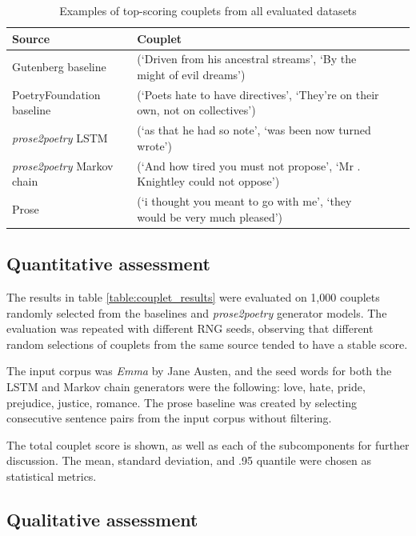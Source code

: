 \documentclass[11pt,a4paper]{article}
\begin{document}
\begin{table}[ht]
\begin{tabular*}{\textwidth}{ll cc}
	\hline\hline
	Source & Couplet \\ [0.5ex]
	\hline\hline
	Gutenberg baseline & (`Driven from his ancestral streams', `By the might of evil dreams') \\ [0.5ex]
	\hline
	PoetryFoundation baseline & (`Poets hate to have directives', `They’re on their own, not on collectives') \\ [0.5ex]
	\hline
	\textit{prose2poetry} LSTM & (`as that he had so note', `was been now turned wrote') \\ [0.5ex]
	\hline
	\textit{prose2poetry} Markov chain & (`And how tired you must not propose', `Mr . Knightley could not oppose') \\ [0.5ex]
	\hline
	Prose & (`i thought you meant to go with me', `they would be very much pleased') \\ [0.5ex]
	\hline
\end{tabular*}
\caption{Examples of top-scoring couplets from all evaluated datasets}
\label{table:bestcouplets}
\end{table}

\subsection{Quantitative assessment}

The results in table \ref{table:couplet_results} were evaluated on 1,000 couplets randomly selected from the baselines and \textit{prose2poetry} generator models. The evaluation was repeated with different RNG seeds, observing that different random selections of couplets from the same source tended to have a stable score.

The input corpus was \textit{Emma} by Jane Austen, and the seed words for both the LSTM and Markov chain generators were the following: love, hate, pride, prejudice, justice, romance. The prose baseline was created by selecting consecutive sentence pairs from the input corpus without filtering.

The total couplet score is shown, as well as each of the subcomponents for further discussion. The mean, standard deviation, and .95 quantile were chosen as statistical metrics.

\subsection{Qualitative assessment}
\end{document}
